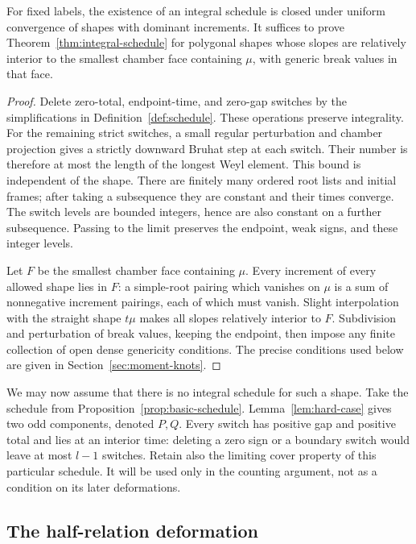 \begin{lemma}\label{int:closedness}
For fixed labels, the existence of an integral schedule is closed under
uniform convergence of shapes with dominant increments.  It suffices
to prove Theorem~\ref{thm:integral-schedule} for polygonal shapes whose
slopes are relatively interior to the smallest chamber face containing
\(\mu\), with generic break values in that face.
\end{lemma}

\begin{proof}
Delete zero-total, endpoint-time, and zero-gap switches by the
simplifications in Definition~\ref{def:schedule}.  These operations
preserve integrality.  For the remaining strict switches, a small
regular perturbation and chamber projection gives a strictly downward
Bruhat step at each switch.  Their number is therefore at most the
length of the longest Weyl element.  This bound is independent of the
shape.  There are finitely many ordered root lists and initial frames;
after taking a subsequence they are constant and their times converge.
The switch levels are bounded integers, hence are also constant on a
further subsequence.  Passing to the limit preserves the endpoint,
weak signs, and these integer levels.

Let \(F\) be the smallest chamber face containing \(\mu\).  Every
increment of every allowed shape lies in \(F\): a simple-root pairing
which vanishes on \(\mu\) is a sum of nonnegative increment pairings,
each of which must vanish.  Slight interpolation with the straight
shape \(t\mu\) makes all slopes relatively interior to \(F\).
Subdivision and perturbation of break values, keeping the endpoint,
then impose any finite collection of open dense genericity conditions.
The precise conditions used below are given in
Section~\ref{sec:moment-knots}.
\end{proof}

We may now assume that there is no integral schedule for such a shape.
Take the schedule from Proposition~\ref{prop:basic-schedule}.
Lemma~\ref{lem:hard-case} gives two odd components, denoted \(P,Q\).
Every switch has positive gap and positive total and lies at an interior
time: deleting a zero sign or a boundary switch would leave at most
\(l-1\) switches.  Retain also the limiting cover property of this
particular schedule.  It will be used only in the counting argument,
not as a condition on its later deformations.

\subsection{The half-relation deformation}

